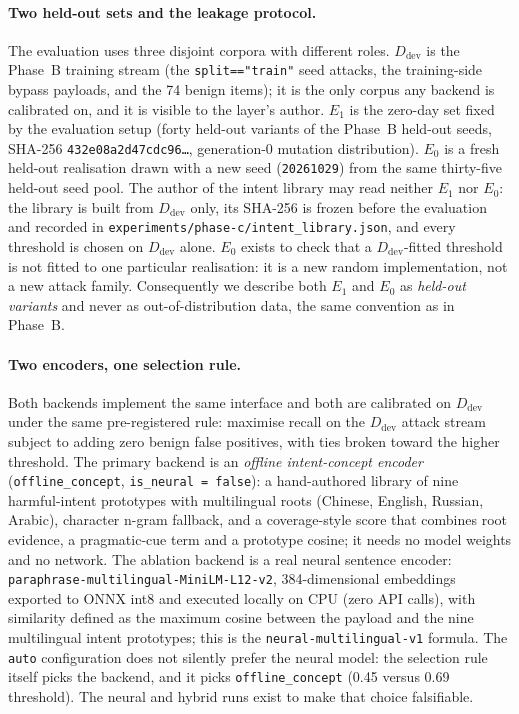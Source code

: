 \paragraph{Two held-out sets and the leakage protocol.} The evaluation uses
three disjoint corpora with different roles. $D_{\mathrm{dev}}$ is the Phase~B
training stream (the \texttt{split=="train"} seed attacks, the training-side
bypass payloads, and the 74 benign items); it is the only corpus any backend is
calibrated on, and it is visible to the layer's author. $E_1$ is the zero-day
set fixed by the evaluation setup (forty held-out variants of the Phase~B
held-out seeds, SHA-256 \texttt{432e08a2d47cdc96\ldots}, generation-0 mutation
distribution). $E_0$ is a fresh held-out realisation drawn with a new seed
(\texttt{20261029}) from the same thirty-five held-out seed pool. The author of
the intent library may read neither $E_1$ nor $E_0$: the library is built from
$D_{\mathrm{dev}}$ only, its SHA-256 is frozen before the evaluation and
recorded in \texttt{experiments/phase-c/intent\_library.json}, and every
threshold is chosen on $D_{\mathrm{dev}}$ alone. $E_0$ exists to check that a
$D_{\mathrm{dev}}$-fitted threshold is not fitted to one particular
realisation: it is a new random implementation, not a new attack family.
Consequently we describe both $E_1$ and $E_0$ as \emph{held-out variants} and
never as out-of-distribution data, the same convention as in Phase~B.

\paragraph{Two encoders, one selection rule.} Both backends implement the same
interface and both are calibrated on $D_{\mathrm{dev}}$ under the same
pre-registered rule: maximise recall on the $D_{\mathrm{dev}}$ attack stream
subject to adding zero benign false positives, with ties broken toward the
higher threshold. The primary backend is an \emph{offline intent-concept
encoder} (\texttt{offline\_concept}, \texttt{is\_neural = false}): a
hand-authored library of nine harmful-intent prototypes with multilingual roots
(Chinese, English, Russian, Arabic), character n-gram fallback, and a
coverage-style score that combines root evidence, a pragmatic-cue term and a
prototype cosine; it needs no model weights and no network. The ablation
backend is a real neural sentence encoder: \texttt{paraphrase-multilingual-MiniLM-L12-v2},
384-dimensional embeddings exported to ONNX int8 and executed locally on CPU
(zero API calls), with similarity defined as the maximum cosine between the
payload and the nine multilingual intent prototypes; this is the
\texttt{neural-multilingual-v1} formula. The \texttt{auto} configuration does
not silently prefer the neural model: the selection rule itself picks the
backend, and it picks \texttt{offline\_concept} (0.45 versus 0.69 threshold).
The neural and hybrid runs exist to make that choice falsifiable.

